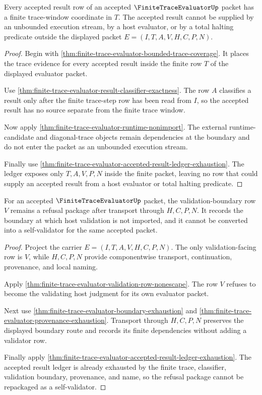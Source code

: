 \begin{theorem}
\label{thm:finite-trace-evaluator-trace-window-accountability}
Every accepted result row of an accepted $\FiniteTraceEvaluatorUp$ packet has
a finite trace-window coordinate in $T$. The accepted result cannot be supplied
by an unbounded execution stream, by a host evaluator, or by a total halting
predicate outside the displayed packet $E=(I,T,A,V,H,C,P,N)$.
\end{theorem}
\begin{proof}
Begin with \autoref{thm:finite-trace-evaluator-bounded-trace-coverage}. It
places the trace evidence for every accepted result inside the finite row $T$
of the displayed evaluator packet.

Use \autoref{thm:finite-trace-evaluator-result-classifier-exactness}. The row
$A$ classifies a result only after the finite trace-step row has been read from
$I$, so the accepted result has no source separate from the finite trace
window.

Now apply \autoref{thm:finite-trace-evaluator-runtime-nonimport}. The external
runtime-candidate and diagonal-trace objects remain dependencies at the
boundary and do not enter the packet as an unbounded execution stream.

Finally use \autoref{thm:finite-trace-evaluator-accepted-result-ledger-exhaustion}.
The ledger exposes only $T,A,V,P,N$ inside the finite packet, leaving no row
that could supply an accepted result from a host evaluator or total halting
predicate.
\end{proof}

\begin{theorem}
\label{thm:finite-trace-evaluator-validation-refusal-package}
For an accepted $\FiniteTraceEvaluatorUp$ packet, the validation-boundary row
$V$ remains a refusal package after transport through $H,C,P,N$. It records the
boundary at which host validation is not imported, and it cannot be converted
into a self-validator for the same accepted packet.
\end{theorem}
\begin{proof}
Project the carrier $E=(I,T,A,V,H,C,P,N)$. The only validation-facing row is
$V$, while $H,C,P,N$ provide componentwise transport, continuation, provenance,
and local naming.

Apply \autoref{thm:finite-trace-evaluator-validation-row-nonescape}. The row
$V$ refuses to become the validating host judgment for its own evaluator
packet.

Next use \autoref{thm:finite-trace-evaluator-boundary-exhaustion} and
\autoref{thm:finite-trace-evaluator-provenance-exhaustion}. Transport through
$H,C,P,N$ preserves the displayed boundary route and records its finite
dependencies without adding a validator row.

Finally apply \autoref{thm:finite-trace-evaluator-accepted-result-ledger-exhaustion}.
The accepted result ledger is already exhausted by the finite trace,
classifier, validation boundary, provenance, and name, so the refusal package
cannot be repackaged as a self-validator.
\end{proof}

